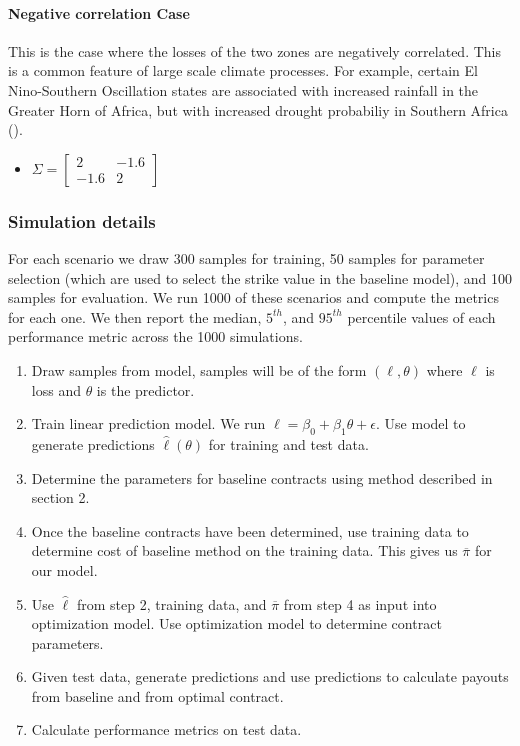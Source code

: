 \documentclass[11pt]{article}
\begin{document}
     \paragraph*{Negative correlation Case}
       This is the case where the losses of the two zones are negatively correlated. This is a common feature of large scale climate processes. For example, certain El Nino-Southern Oscillation states are associated with increased rainfall in the Greater Horn of Africa, but with increased drought probabiliy in Southern Africa (\cite{barrett2007poverty}). 
       \begin{itemize}
           \item $\Sigma = \begin{bmatrix}
               2 & -1.6 \\
               -1.6 & 2 
               \end{bmatrix} $
       \end{itemize}

   \subsubsection{Simulation details}
     For each scenario we draw 300 samples for training, 50 samples for parameter selection (which are used to select the strike value in the baseline model), and 100 samples for evaluation. We run 1000 of these scenarios and compute the metrics for each one. We then report the median, $5^{th}$, and $95^{th}$ percentile values of each performance metric across the 1000 simulations. 
     \begin{enumerate}
       \item Draw samples from model, samples will be of the form $(\ell,\theta)$ where $\ell$ is loss and $\theta$ is the predictor. 
       \item Train linear prediction model. We run $\ell = \beta_0 + \beta_1\theta +\epsilon$. Use model to generate predictions $\hat{\ell}(\theta)$ for training and test data. 
       \item Determine the parameters for baseline contracts using method described in section 2. 
       \item Once the baseline contracts have been determined, use training data to determine cost of baseline method on the training data. This gives us $\overline{\pi}$ for our model. 
       \item Use $\hat{\ell}$ from step 2, training data, and $\overline{\pi}$ from step 4 as input into optimization model. Use optimization  model to determine contract parameters. 
       \item Given test data, generate predictions and use predictions to calculate payouts from baseline and from optimal contract. 
       \item Calculate performance metrics on test data. 
     \end{enumerate}
\end{document}

